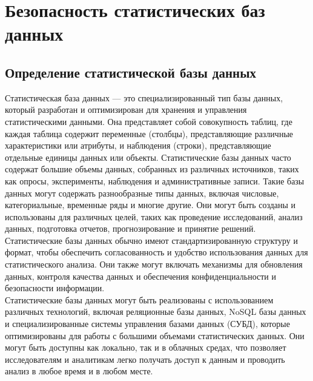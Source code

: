 \section{Безопасность статистических баз данных}

\subsection{Определение статистической базы данных}

Статистическая база данных — это специализированный тип базы данных, который разработан и оптимизирован для хранения и управления статистическими данными. Она представляет собой совокупность таблиц, где каждая таблица содержит переменные (столбцы), представляющие различные характеристики или атрибуты, и наблюдения (строки), представляющие отдельные единицы данных или объекты. Статистические базы данных часто содержат большие объемы данных, собранных из различных источников, таких как опросы, эксперименты, наблюдения и административные записи. Такие базы данных могут содержать разнообразные типы данных, включая числовые, категориальные, временные ряды и многие другие. Они могут быть созданы и использованы для различных целей, таких как проведение исследований, анализ данных, подготовка отчетов, прогнозирование и принятие решений.
\\

Статистические базы данных обычно имеют стандартизированную структуру и формат, чтобы обеспечить согласованность и удобство использования данных для статистического анализа. Они также могут включать механизмы для обновления данных, контроля качества данных и обеспечения конфиденциальности и безопасности информации.
\\
Статистические базы данных могут быть реализованы с использованием различных технологий, включая реляционные базы данных, NoSQL базы данных и специализированные системы управления базами данных (СУБД), которые оптимизированы для работы с большими объемами статистических данных. Они могут быть доступны как локально, так и в облачных средах, что позволяет исследователям и аналитикам легко получать доступ к данным и проводить анализ в любое время и в любом месте.

